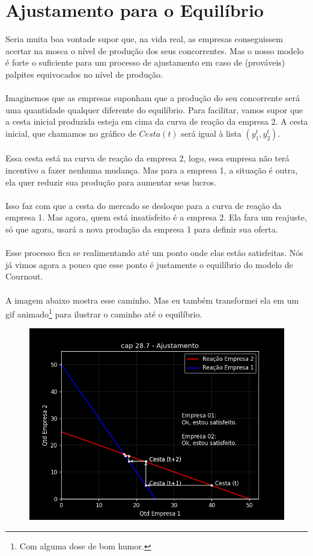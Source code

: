 \documentclass[a4paper,11pt,oneside]{book}
\theoremstyle{definition}
\theoremstyle{break}
\begin{document}
\section{Ajustamento para o Equilíbrio}

Seria muita boa vontade supor que, na vida real, as empresas conseguissem acertar na mosca o nível de produção dos seus concorrentes. Mas o nosso modelo é forte o suficiente para um processo de ajustamento em caso de (prováveis) palpites equivocados no nível de produção.
\\
\\
Imaginemos que as empresas suponham que a produção do seu concorrente será uma quantidade qualquer diferente do equilíbrio. Para facilitar, vamos supor que a cesta inicial produzida esteja em cima da curva de reação da empresa 2. A cesta inicial, que chamamos no gráfico de $Cesta(t)$ será igual à lista $(y_1^t,y_2^t)$.
\\
\\
Essa cesta está na curva de reação da empresa 2, logo, essa empresa não terá incentivo a fazer nenhuma mudança. Mas para a empresa 1, a situação é outra, ela quer reduzir sua produção para aumentar seus lucros.
\\
\\
Isso faz com que a cesta do mercado se desloque para a curva de reação da empresa 1. Mas agora, quem está insatisfeito é a empresa 2. Ela fara um reajuste, só que agora, usará a nova produção da empresa 1 para definir sua oferta.
\\
\\
Esse processo fica se realimentando até um ponto onde elas estão satisfeitas. Nós já vimos agora a pouco que esse ponto é justamente o equilíbrio do modelo de Cournout.
\\
\\
A imagem abaixo mostra esse caminho. Mas eu também transformei ela em um gif animado\footnote{Com alguma dose de bom humor.} para ilustrar o caminho até o equilíbrio.

\begin{figure}[H]
\centering
\includegraphics[scale=0.75]{cap28_7-ajustamento.png}
\end{figure}
\end{document}
